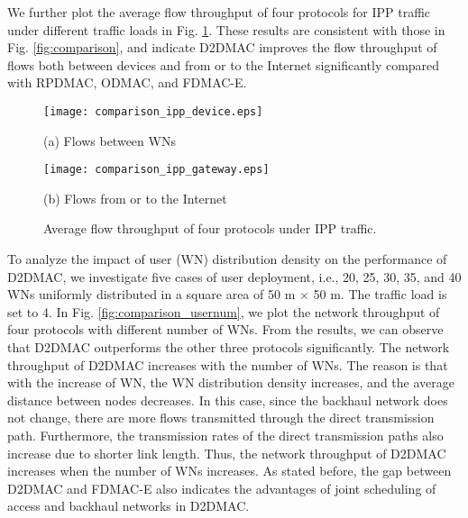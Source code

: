 \documentclass[journal]{IEEEtran}
\begin{document}
We further plot the average flow throughput of four protocols for IPP traffic under different traffic
loads in Fig. \ref{fig:comparison_flow}. These results are consistent with those in Fig.
\ref{fig:comparison}, and indicate D2DMAC improves the flow throughput of flows both between
devices and from or to the Internet significantly compared with RPDMAC, ODMAC, and FDMAC-E.





\begin{figure}[htbp]
\begin{minipage}[t]{0.5\linewidth}
\centering
\texttt{[image: comparison\_ipp\_device.eps]}
\centerline{\small (a) Flows between WNs}
\end{minipage}\begin{minipage}[t]{0.5\linewidth}
\centering
\texttt{[image: comparison\_ipp\_gateway.eps]}
\centerline{\small (b) Flows from or to the Internet}
\end{minipage}\caption{Average flow throughput of four protocols under IPP traffic.}
\label{fig:comparison_flow} \vspace*{-3mm}
\end{figure}


To analyze the impact of user (WN) distribution density on the performance of D2DMAC, we investigate five cases of user deployment, i.e., 20, 25, 30, 35, and 40 WNs uniformly distributed in a square area of 50 m $ \times$
50 m. The traffic load is set to 4. In Fig. \ref{fig:comparison_usernum}, we plot the network throughput of four protocols with different number of WNs. From the results, we can observe that D2DMAC outperforms the other three protocols significantly. The network throughput of D2DMAC increases with the number of WNs. The reason is that with the increase of WN, the WN distribution density increases, and the average distance between nodes decreases. In this case, since the backhaul network does not change, there are more flows transmitted through the direct transmission path. Furthermore, the transmission rates of the direct transmission paths also increase due to shorter link length. Thus, the network throughput of D2DMAC increases when the number of WNs increases. As stated before, the gap between D2DMAC and FDMAC-E also indicates the advantages of joint scheduling of access and backhaul networks in D2DMAC.
\end{document}
